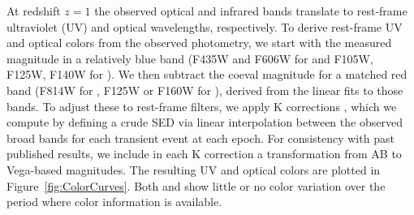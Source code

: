 At redshift $z=1$ the observed optical and infrared bands translate to
rest-frame ultraviolet (UV) and optical wavelengths, respectively.  To
derive rest-frame UV and optical colors from the observed photometry,
we start with the measured magnitude in a relatively blue band (F435W
and F606W for \spockone and F105W, F125W, F140W for \spocktwo).  We
then subtract the coeval magnitude for a matched red band (F814W for
\spockone, F125W or F160W for \spocktwo), derived from the linear fits
to those bands.  To adjust these to rest-frame filters, we apply K
corrections \citep[following][]{Hogg:2002}, which we compute by
defining a crude SED via linear interpolation between the observed
broad bands for each transient event at each epoch.  For consistency
with past published results, we include in each K correction a
transformation from AB to Vega-based magnitudes.  The resulting UV and
optical colors are plotted in Figure~\ref{fig:ColorCurves}.  Both
\spockone and \spocktwo show little or no color variation over the
period where color information is available.  
